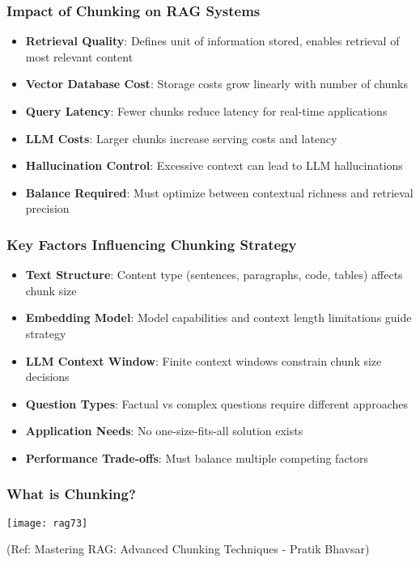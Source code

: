 \begin{frame}[fragile]\frametitle{Impact of Chunking on RAG Systems}
      \begin{itemize}
\item \textbf{Retrieval Quality}: Defines unit of information stored, enables retrieval of most relevant content
\item \textbf{Vector Database Cost}: Storage costs grow linearly with number of chunks
\item \textbf{Query Latency}: Fewer chunks reduce latency for real-time applications
\item \textbf{LLM Costs}: Larger chunks increase serving costs and latency
\item \textbf{Hallucination Control}: Excessive context can lead to LLM hallucinations
\item \textbf{Balance Required}: Must optimize between contextual richness and retrieval precision
  \end{itemize}
\end{frame}

\begin{frame}[fragile]\frametitle{Key Factors Influencing Chunking Strategy}
      \begin{itemize}
\item \textbf{Text Structure}: Content type (sentences, paragraphs, code, tables) affects chunk size
\item \textbf{Embedding Model}: Model capabilities and context length limitations guide strategy
\item \textbf{LLM Context Window}: Finite context windows constrain chunk size decisions
\item \textbf{Question Types}: Factual vs complex questions require different approaches
\item \textbf{Application Needs}: No one-size-fits-all solution exists
\item \textbf{Performance Trade-offs}: Must balance multiple competing factors
  \end{itemize}
\end{frame}

\begin{frame}[fragile]\frametitle{What is Chunking?}

  
  	\begin{center}
	\texttt{[image: rag73]}
	
	{\tiny (Ref: Mastering RAG: Advanced Chunking Techniques - Pratik Bhavsar)}
	
	\end{center}
\end{frame}

